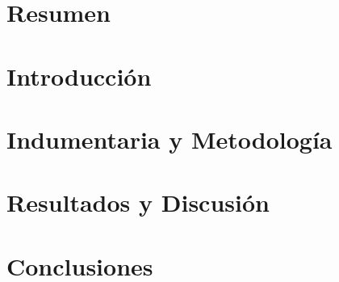 \documentclass[12pt]{article}
\begin{document}
	

	\tableofcontents
	\pagebreak

	\listoffigures
	\listoftables

	\newpage

	\section{Resumen}
	

	\newpage

	\section{Introducción}
	

	\section{Indumentaria y Metodología}
	

	\section{Resultados y Discusión}
	

	\section{Conclusiones}
	

	
\end{document}
